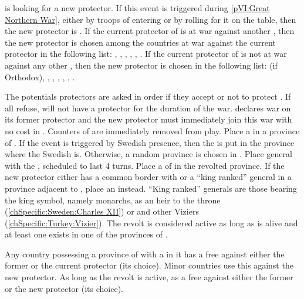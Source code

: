 

\condition{}
\aparag \paysukraine is looking for a new protector.
\bparag If this event is triggered during \ref{pVI:Great Northern War}, either
by troops of \SUE entering \regionUkraine or by rolling for it on the table,
then the new protector is \SUE.
\bparag If the current protector of \paysukraine is at war against another
\MAJ, then the new protector is chosen among the countries at war against the
current protector in the following list: \RUS, \POL, \TUR, \AUS, \SUE, \PRU.
\bparag If the current protector of \paysukraine is not at war against any
other \MAJ, then the new protector is chosen in the following list: \POL (if
Orthodox), \RUS, \TUR, \POL, \AUS, \SUE, \PRU.

\phevnt
\aparag The potentials protectors are asked in order if they accept or not to
protect \paysukraine.
\bparag If all refuse, \paysukraine will not have a protector for the duration
of the war.
\aparag \paysukraine declares war on its former protector and the new
protector must immediately join this war with no cost in \STAB.
\aparag Counters of \paysukraine are immediately removed from play.
\aparag Place a \REVOLT \faceplus in a province of \regionUkraine.
\bparag If the event is triggered by Swedish presence, then the \REVOLT is put
in the province where the Swedish \ARMY is. Otherwise, a random province is
chosen in \paysukraine.
\aparag Place general  with the \REVOLT, scheduled to
last 4 turns.
\aparag Place a \LD of \paysukraine in the revolted province.
\bparag If the new protector either has a common border with \paysukraine or a
``king ranked'' general in a province adjacent to \paysukraine, place an
\ARMY\facemoins instead.
\bparag ``King ranked'' generals are those bearing the king symbol, namely
monarchs,  as an heir to the throne
(\ref{chSpecific:Sweden:Charles XII}) or  and other Viziers
(\ref{chSpecific:Turkey:Vizier}).
\aparag The revolt is considered active as long as \leaderMazepa is alive and
at least one \REVOLT exists in one of the provinces of \regionUkraine.

\phdipl
\aparag Any country possessing a province of \regionUkraine with a \REVOLT in
it has a free \CB against either the former or the current protector (its
choice).
\bparag Minor countries use this \CB against the new protector.
\aparag As long as the revolt is active, \TUR as a free \CB against either the
former or the new protector (its choice).

